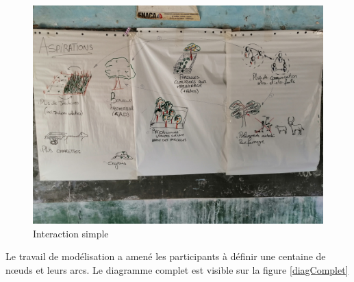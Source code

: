 \begin{figure}
  \begin{center}
  \includegraphics[width=15cm]{img/aspiration_formulee.jpg}
  \end{center}
  \caption{Interaction simple }
  \label{aspiration}
\end{figure}

Le travail de modélisation a amené les participants à définir une centaine de nœuds et leurs arcs. Le diagramme complet est visible sur la figure \ref{diagComplet}


